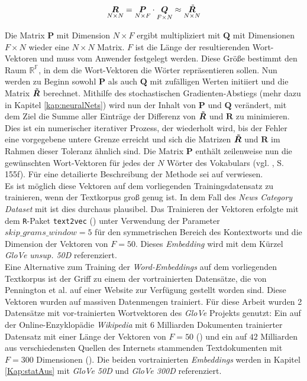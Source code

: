 \documentclass[a4paper,11pt]{article}
\begin{document}
\begin{equation*}
\underset{N \times N}{\bm{R}} = \underset{N \times F}{\bm{P}} \cdot \underset{F \times N}{\bm{Q}} \approx  \underset{N \times N}{\Tilde{\bm{R}}} 
\end{equation*}

Die Matrix $\bm{P}$ mit Dimension $N \times F$ ergibt multipliziert mit $\bm{Q}$ mit Dimensionen $F \times N$ wieder eine $N \times N$ Matrix. $F$ ist die Länge der resultierenden Wort-Vektoren und muss vom Anwender festgelegt werden. Diese Größe bestimmt den Raum $\mathbb{R^F}$, in dem die Wort-Vektoren die Wörter repräsentieren sollen. Nun werden zu Beginn sowohl $\bm{P}$ als auch $\bm{Q}$ mit zufälligen Werten initiiert und die Matrix $\bm{\Tilde{R}}$ berechnet. Mithilfe des stochastischen Gradienten-Abstiegs (mehr dazu in Kapitel \ref{kap:neuralNets}) wird nun der Inhalt von $\bm{P}$ und $\bm{Q}$ verändert, mit dem Ziel die Summe aller Einträge der Differenz von $\bm{\Tilde{R}}$ und $\bm{R}$ zu minimieren. Dies ist ein numerischer iterativer Prozess, der wiederholt wird, bis der Fehler eine vorgegebene untere Grenze erreicht und sich die Matrizen $\bm{\Tilde{R}}$ und $\bm{R}$ im Rahmen dieser Toleranz ähnlich sind. Die Matrix $\bm{P}$ enthält zeilenweise nun die gewünschten Wort-Vektoren für jedes der $N$ Wörter des Vokabulars (vgl. \cite{keras}, S. 155f). Für eine detailierte Beschreibung der Methode sei auf \cite{glovePaper} verwiesen. \\
Es ist möglich diese Vektoren auf dem vorliegenden Trainingsdatensatz zu trainieren, wenn der Textkorpus groß genug ist. In dem Fall des \textit{News Category Dataset} mit  ist dies durchaus plausibel. Das Trainieren der Vektoren erfolgte mit dem \texttt{R}-Paket \texttt{text2vec} (\cite{text2vec}) unter Verwendung der Parameter $skip\_grams\_window = 5$ für den symmetrischen Bereich des Kontextworts und die Dimension der Vektoren von $F = 50$. Dieses \textit{Embedding} wird mit dem Kürzel \textit{GloVe unsup. 50D} referenziert. \\
Eine Alternative zum Training der \textit{Word-Embeddings} auf dem vorliegenden Textkorpus ist der Griff zu einem der vortrainierten Datensätze, die von Pennington et al. auf einer Website zur Verfügung gestellt worden sind. Diese Vektoren wurden auf massiven Datenmengen trainiert. Für diese Arbeit wurden 2 Datensätze mit vor-trainierten Wortvektoren des \textit{GloVe} Projekts genutzt: Ein auf der Online-Enzyklopädie \textit{Wikipedia} mit $6$ Milliarden Dokumenten trainierter Datensatz mit einer Länge der Vektoren von $F = 50$ (\cite{gloveWiki}) und ein auf $42$ Milliarden aus verschiedensten Quellen des Internets stammenden Textdokumenten mit $F = 300$ Dimensionen (\cite{glovePaper}). Die beiden vortrainierten \textit{Embeddings} werden in Kapitel \ref{Kap:statAus} mit \textit{GloVe 50D} und \textit{GloVe 300D} referenziert.\\
\end{document}
